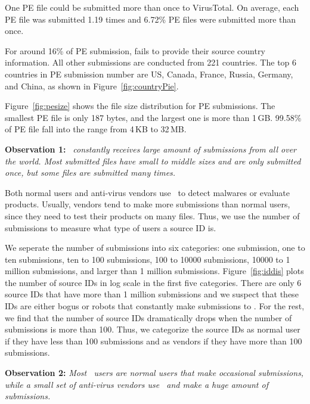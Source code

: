 One PE file could be submitted more than once to VirusTotal. 
On average, each PE file was submitted 1.19 times and 6.72\% PE files were submitted more than once. 

For around 16\% of PE submission, 
\vt fails to provide their source country information. 
All other submissions are conducted from 221 countries. 
The top 6 countries in PE submission number are US, Canada, France, Russia, Germany, and China, 
as shown in Figure~\ref{fig:countryPie}.

Figure~\ref{fig:pesize} shows the file size distribution for PE submissions. 
The smallest PE file is only 187 bytes, and the largest one is more than 1\,GB. 
99.58\% of PE file fall into the range from 4\,KB to 32\,MB. 

{\bf Observation 1:} 
{\em \vt\ constantly receives large amount of submissions from all over the world. 
Most submitted files have small to middle sizes and are only submitted once, 
but some files are submitted many times.}


Both normal users and anti-virus vendors use \vt\ to detect malwares or evaluate products.
Usually, vendors tend to make more submissions than normal users, since they need to test their products on many files.
Thus, we use the number of submissions to measure what type of users a source ID is.

We seperate the number of submissions into six categories:
one submission, one to ten submissions, ten to 100 submissions, 100 to 10000 submissions, 10000 to 1 million submissions, and larger than 1 million submissions.
Figure~\ref{fig:iddis} plots the number of source IDs in log scale in the first five categories.
There are only 6 source IDs that have more than 1 million submissions and we suspect that these IDs are either bogus or robots 
that constantly make submissions to \vt.
For the rest, we find that the number of source IDs dramatically drops when the number of submissions is more than 100.
Thus, we categorize the source IDs as normal user if they have less than 100 submissions and as vendors if they have more than 100 submissions.

{\bf Observation 2:} 
{\em Most \vt\ users are normal users that make occasional submissions, while a small set of anti-virus vendors use \vt\ and make a huge amount of submissions.}

